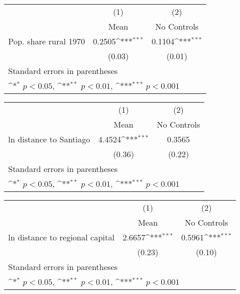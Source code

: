 {
\def\sym#1{\ifmmode^{#1}\else\(^{#1}\)\fi}
\begin{tabular}{l*{2}{c}}
\hline\hline
                    &\multicolumn{1}{c}{(1)}&\multicolumn{1}{c}{(2)}\\
                    &\multicolumn{1}{c}{Mean}&\multicolumn{1}{c}{No Controls}\\
\hline
Pop. share rural 1970&      0.2505\sym{***}&      0.1104\sym{***}\\
                    &      (0.03)         &      (0.01)         \\
\hline\hline
\multicolumn{3}{l}{\footnotesize Standard errors in parentheses}\\
\multicolumn{3}{l}{\footnotesize \sym{*} \(p<0.05\), \sym{**} \(p<0.01\), \sym{***} \(p<0.001\)}\\
\end{tabular}
}
{
\def\sym#1{\ifmmode^{#1}\else\(^{#1}\)\fi}
\begin{tabular}{l*{2}{c}}
\hline\hline
                    &\multicolumn{1}{c}{(1)}&\multicolumn{1}{c}{(2)}\\
                    &\multicolumn{1}{c}{Mean}&\multicolumn{1}{c}{No Controls}\\
\hline
ln distance to Santiago&      4.4524\sym{***}&      0.3565         \\
                    &      (0.36)         &      (0.22)         \\
\hline\hline
\multicolumn{3}{l}{\footnotesize Standard errors in parentheses}\\
\multicolumn{3}{l}{\footnotesize \sym{*} \(p<0.05\), \sym{**} \(p<0.01\), \sym{***} \(p<0.001\)}\\
\end{tabular}
}
{
\def\sym#1{\ifmmode^{#1}\else\(^{#1}\)\fi}
\begin{tabular}{l*{2}{c}}
\hline\hline
                    &\multicolumn{1}{c}{(1)}&\multicolumn{1}{c}{(2)}\\
                    &\multicolumn{1}{c}{Mean}&\multicolumn{1}{c}{No Controls}\\
\hline
ln distance to regional capital&      2.6657\sym{***}&      0.5961\sym{***}\\
                    &      (0.23)         &      (0.10)         \\
\hline\hline
\multicolumn{3}{l}{\footnotesize Standard errors in parentheses}\\
\multicolumn{3}{l}{\footnotesize \sym{*} \(p<0.05\), \sym{**} \(p<0.01\), \sym{***} \(p<0.001\)}\\
\end{tabular}
}
